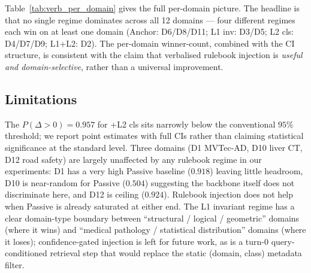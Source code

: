 Table~\ref{tab:verb_per_domain} gives the full per-domain picture.
The headline is that no single regime dominates across all 12
domains --- four different regimes each win on at least one domain
(Anchor: D6/D8/D11; L1 inv: D3/D5; L2 cls: D4/D7/D9; L1+L2: D2).
The per-domain winner-count, combined with the CI structure, is
consistent with the claim that verbalised rulebook injection is
\emph{useful and domain-selective}, rather than a universal
improvement.

\subsection{Limitations}
\label{ssec:verb_limitations}
The $P(\Delta{>}0){=}0.957$ for +L2 cls sits narrowly below the
conventional $95\%$ threshold; we report point estimates with full
CIs rather than claiming statistical significance at the standard
level. Three domains (D1 MVTec-AD, D10 liver CT, D12 road safety)
are largely unaffected by any rulebook regime in our experiments:
D1 has a very high Passive baseline ($0.918$) leaving little
headroom, D10 is near-random for Passive ($0.504$) suggesting the
backbone itself does not discriminate here, and D12 is ceiling
($0.924$). Rulebook injection does not help when Passive is already
saturated at either end. The L1 invariant regime has a clear
domain-type boundary between ``structural / logical / geometric''
domains (where it wins) and ``medical pathology / statistical
distribution'' domains (where it loses); confidence-gated injection
is left for future work, as is a turn-0 query-conditioned
retrieval step that would replace the static (domain, class)
metadata filter.
